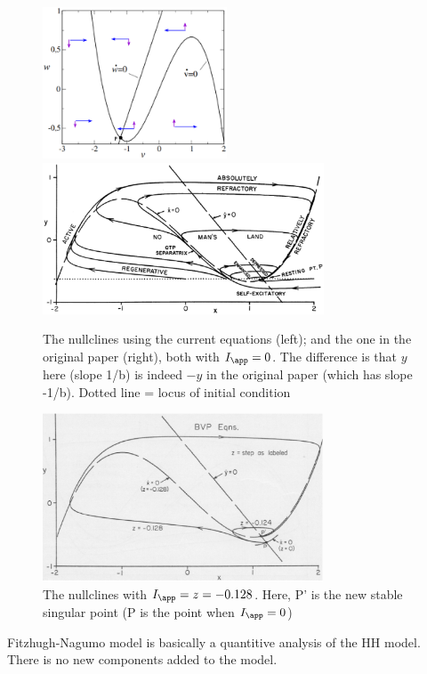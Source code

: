 \begin{figure}[hbt]
  \centerline{\includegraphics[height=4.5cm,
    angle=0]{./images/FitzHugh_nullclines.eps}
    \includegraphics[height=4.5cm,
    angle=0]{./images/FitzHugh_nullclines-original.eps}
    }
  \caption{The nullclines using the current equations (left); and the one in the
  original paper (right), both with $I_\app=0$. The difference is that $y$ here
  (slope 1/b) is indeed $-y$ in the original paper (which has slope -1/b). Dotted line = locus of
  initial condition}
  \label{fig:FitzHugh_nullclines}
\end{figure}

\begin{figure}[hbt]
  \centerline{\includegraphics[height=5cm,
    angle=0]{./images/FitzHugh_nullclines-original_2.eps}}
  \caption{The nullclines with $I_\app=z=-0.128$. Here, P' is the new stable
  singular point (P is the point when $I_\app=0$)}
  \label{fig:FitzHugh-singularpoint}
\end{figure}

\begin{mdframed}
  Fitzhugh-Nagumo model is basically a quantitive analysis of the HH
  model. There is no new components added to the model.
\end{mdframed}


